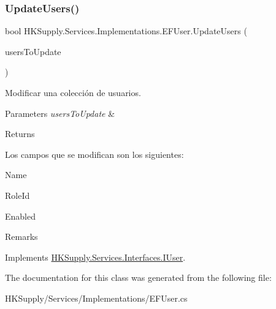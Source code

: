 \subsubsection{\texorpdfstring{Update\+Users()}{UpdateUsers()}}
{\footnotesize\ttfamily bool H\+K\+Supply.\+Services.\+Implementations.\+E\+F\+User.\+Update\+Users (\begin{DoxyParamCaption}\item[{I\+Enumerable$<$ \hyperlink{class_h_k_supply_1_1_models_1_1_user}{User} $>$}]{users\+To\+Update }\end{DoxyParamCaption})}



Modificar una colección de usuarios. 


\begin{DoxyParams}{Parameters}
{\em users\+To\+Update} & \\
\hline
\end{DoxyParams}
\begin{DoxyReturn}{Returns}

\end{DoxyReturn}


Los campos que se modifican son los siguientes\+:
\begin{DoxyItemize}
\item Name
\item Role\+Id
\item Enabled
\item Remarks 
\end{DoxyItemize}

Implements \hyperlink{interface_h_k_supply_1_1_services_1_1_interfaces_1_1_i_user}{H\+K\+Supply.\+Services.\+Interfaces.\+I\+User}.



The documentation for this class was generated from the following file\+:\begin{DoxyCompactItemize}
\item 
H\+K\+Supply/\+Services/\+Implementations/E\+F\+User.\+cs\end{DoxyCompactItemize}
